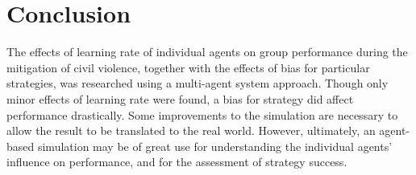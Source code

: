 \section{Conclusion}
The effects of learning rate of individual agents on group performance during the mitigation of civil violence, together with the effects of bias for particular strategies, was researched using a multi-agent 
system approach. Though only minor effects of learning rate were found, a bias for strategy did affect performance drastically. Some improvements to the simulation are necessary to allow the result to 
be translated to the real world. However, ultimately, an agent-based simulation may be of great use for understanding the individual agents' influence on performance, and for the assessment of strategy success. 

